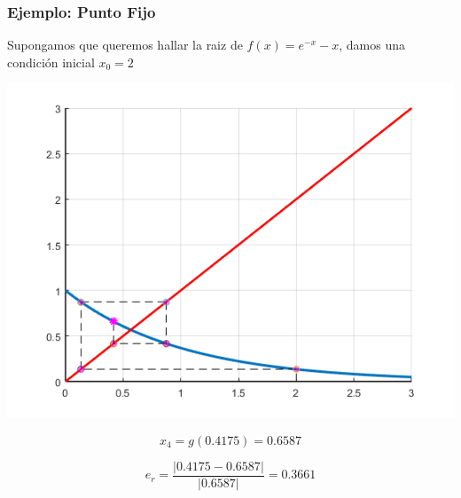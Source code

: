 \documentclass[xcolor=svgnames]{beamer} %
\theoremstyle{plain}
\theoremstyle{definition}
\begin{document}
\begin{frame}
\frametitle{Ejemplo: Punto Fijo}

Supongamos que queremos hallar la raiz de $f(x) = e^{-x} -x$,
damos una condición inicial $x_0=2$


\begin{minipage}{.45\linewidth}
\includegraphics[width=\linewidth]{fp_example/iter4.png} 

\end{minipage}  \begin{minipage}{.45\linewidth}
$$ x_4 = g(0.4175) = 0.6587$$

$$e_r = \frac{|0.4175 - 0.6587|}{|0.6587|} = 0.3661$$
\end{minipage}
\end{frame}
\end{document}
